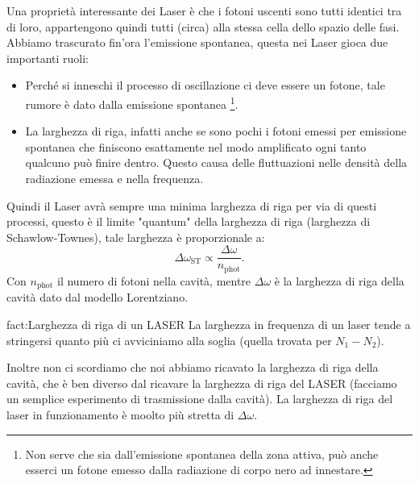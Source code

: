 \noindent
Una proprietà interessante dei Laser è che i fotoni uscenti sono tutti identici tra di loro, appartengono quindi tutti (circa) alla stessa cella dello spazio delle fasi. \\
Abbiamo trascurato fin'ora l'emissione spontanea, questa nei Laser gioca due importanti ruoli:
\begin{itemize}
    \item Perché si inneschi il processo di oscillazione ci deve essere un fotone, tale rumore è dato dalla emissione spontanea 
    \footnote{Non serve che sia dall'emissione spontanea della zona attiva, può anche esserci un fotone emesso dalla radiazione di corpo nero ad innestare.}.
\item La larghezza di riga, infatti anche se sono pochi i fotoni emessi per emissione spontanea che finiscono esattamente nel modo amplificato ogni tanto qualcuno può finire dentro. Questo causa delle fluttuazioni nelle densità della radiazione emessa e nella frequenza.
\end{itemize}
Quindi il Laser avrà sempre una minima larghezza di riga per via di questi processi, questo è il limite "quantum" della larghezza di riga (larghezza di Schawlow-Townes), tale larghezza è proporzionale a:
\[
    \Delta\omega_\text{ST} \propto\frac{\Delta\omega}{n_\text{phot} } 
.\] 
Con $n_\text{phot}$ il numero di fotoni nella cavità, mentre $\Delta\omega$ è la larghezza di riga della cavità dato dal modello Lorentziano.\\
\begin{fact}{fact:Larghezza di riga di un LASER}
La larghezza in frequenza di un laser tende a stringersi quanto più ci avviciniamo alla soglia (quella trovata per $N_1-N_2$).
\end{fact}
Inoltre non ci scordiamo che noi abbiamo ricavato la larghezza di riga della cavità, che è ben diverso dal ricavare la larghezza di riga del LASER (facciamo un semplice esperimento di trasmissione dalla cavità). La larghezza di riga del laser in funzionamento è moolto più stretta di $\Delta\omega$.
